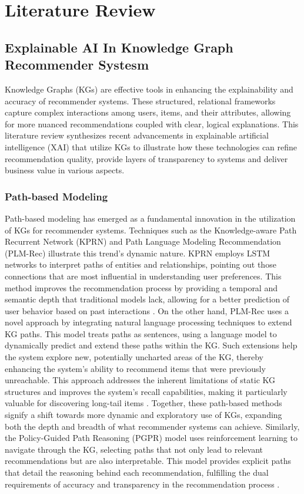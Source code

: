 \chapter{Literature Review}
\label{chap:literature_review}

\section{Explainable AI In Knowledge Graph Recommender Systesm}

Knowledge Graphs (KGs) are effective tools in enhancing the explainability and accuracy
of recommender systems. These structured, relational frameworks capture complex interactions
among users, items, and their attributes, allowing for more nuanced
recommendations coupled with clear, logical explanations. This literature review
synthesizes recent advancements in explainable artificial intelligence (XAI)
that utilize KGs to illustrate how these technologies can refine recommendation
quality, provide layers of transparency to systems and deliver business value in
various aspects.

\subsection{Path-based Modeling}

Path-based modeling has emerged as a fundamental innovation in the utilization
of KGs for recommender systems. Techniques such as the Knowledge-aware Path Recurrent
Network (KPRN) and Path Language Modeling Recommendation (PLM-Rec) illustrate this
trend's dynamic nature. KPRN employs LSTM networks to interpret paths of
entities and relationships, pointing out those connections that are most influential
in understanding user preferences. This method improves the recommendation
process by providing a temporal and semantic depth that traditional models lack,
allowing for a better prediction of user behavior based on past interactions \parencite{wang_explainable_2019}.
On the other hand, PLM-Rec uses a novel approach by integrating natural language
processing techniques to extend KG paths. This model treats paths as sentences,
using a language model to dynamically predict and extend these paths within the
KG. Such extensions help the system explore new, potentially uncharted areas of
the KG, thereby enhancing the system’s ability to recommend items that were previously
unreachable. This approach addresses the inherent limitations of static KG
structures and improves the system's recall capabilities, making it particularly
valuable for discovering long-tail items \parencite{geng_path_2022}. Together,
these path-based methods signify a shift towards more dynamic and exploratory
use of KGs, expanding both the depth and breadth of what recommender systems can
achieve. Similarly, the Policy-Guided Path Reasoning (PGPR) model uses reinforcement
learning to navigate through the KG, selecting paths that not only lead to
relevant recommendations but are also interpretable. This model provides explicit
paths that detail the reasoning behind each recommendation, fulfilling the dual
requirements of accuracy and transparency in the recommendation process
\parencite{xian_reinforcement_2019}.

